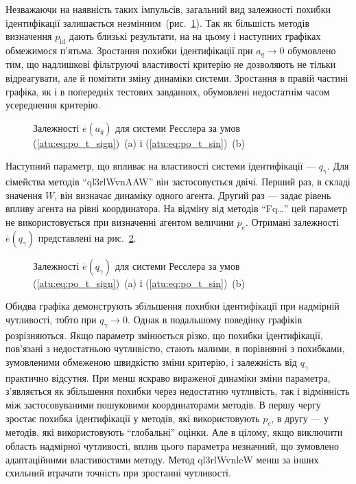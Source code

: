 Незважаючи на наявність таких імпульсів, загальний
вид залежності похибки ідентифікації залишається
незмінним~(рис.~\ref{atu:f:ross_e_a_q}).
Так як більшість методів визначення
$p_\mathrm{id} $ дають близькі результати, на на цьому і наступних
графіках обмежимося п'ятьма. Зростання похибки ідентифікації
при
$a_q \to 0 $ обумовлено тим, що надлишкові фільтруючі властивості
критерію не дозволяють не тільки відреагувати, але й помітити
зміну динаміки системи. Зростання в правій частині графіка,
як і в попередніх тестових завданнях, обумовлені недостатнім
часом усереднення критерію.

\begin{figure}[htb!]
  \caption{Залежності $ \overline{e} (a_q) $ для системи Ресслера за умов (\ref{atu:eq:po_t_sign})~(a) і (\ref{atu:eq:po_t_sin})~(b)}
\label{atu:f:ross_e_a_q}
\end{figure}

Наступний параметр, що впливає на властивості системи
ідентифікації ---
$ q_\gamma $. Для сімейства методів ``ql3rlWvnAAW'' він застосовується
двічі. Перший раз, в складі значення
$W$, він визначає динаміку одного агента. Другий раз --- задає
рівень впливу агента на рівні координатора. На відміну від
методів ``Fq\ldots'' цей параметр не використовується при визначенні агентом
величини $p_e$. Отримані залежності
$\overline{e}(q_\gamma) $ представлені на рис.~\ref{atu:f:ross_e_q_gamma}.

\begin{figure}[htb!]
\caption{Залежності $\overline{e}(q_\gamma) $ для системи Ресслера за умов (\ref{atu:eq:po_t_sign})~(a) і (\ref{atu:eq:po_t_sin})~(b)}
\label{atu:f:ross_e_q_gamma}
\end{figure}

Обидва графіка демонструють збільшення похибки ідентифікації
при надмірній чутливості, тобто при
$q_\gamma \to 0$. Однак в подальшому поведінку графіків
розрізняються. Якщо параметр змінюється різко, що похибки
ідентифікації, пов'язані з недостатньою чутливістю, стають
малими, в порівнянні з похибками, зумовленими обмеженою
швидкістю зміни критерію, і залежність від
$q_\gamma$ практично відсутня. При менш яскраво вираженої динаміки
зміни параметра, з'являється як збільшення похибки через
недостатню чутливість, так і відмінність між застосовуваними
пошуковими координаторами методів. В першу чергу зростає
похибка ідентифікації у методів, які використовують
$p_c$, в другу --- у методів, які використовують ``глобальні'' оцінки.
Але в цілому, якщо виключити область надмірної
чутливості, вплив цього параметра незначний, що зумовлено
адаптаційними властивостями методу. Метод ql3rlWvnleW менш за інших
схильний втрачати точність при зростанні чутливості.

